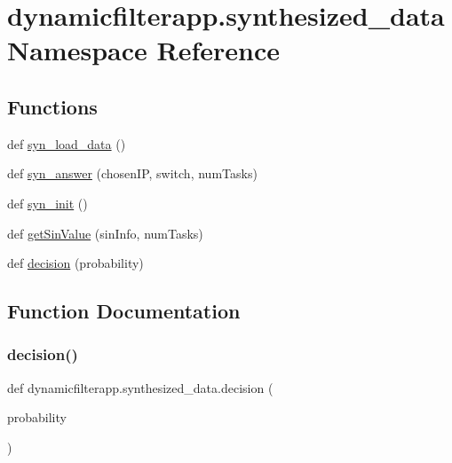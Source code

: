 \hypertarget{namespacedynamicfilterapp_1_1synthesized__data}{}\section{dynamicfilterapp.\+synthesized\+\_\+data Namespace Reference}
\label{namespacedynamicfilterapp_1_1synthesized__data}
\subsection*{Functions}
\begin{DoxyCompactItemize}
\item 
def \mbox{\hyperlink{namespacedynamicfilterapp_1_1synthesized__data_af2a5ccfeb2728fbcc461071a4755b1c9}{syn\+\_\+load\+\_\+data}} ()
\item 
def \mbox{\hyperlink{namespacedynamicfilterapp_1_1synthesized__data_a0e5fb46482e0da528e2f04b80ec56a16}{syn\+\_\+answer}} (chosen\+IP, switch, num\+Tasks)
\item 
def \mbox{\hyperlink{namespacedynamicfilterapp_1_1synthesized__data_aa39bcaa003257ebb92c9584885a3e39f}{syn\+\_\+init}} ()
\item 
def \mbox{\hyperlink{namespacedynamicfilterapp_1_1synthesized__data_a5a0a7234abf6b7bcefdfd576e9065d20}{get\+Sin\+Value}} (sin\+Info, num\+Tasks)
\item 
def \mbox{\hyperlink{namespacedynamicfilterapp_1_1synthesized__data_a72f48dd730b6717fb7657e3bc7705c2f}{decision}} (probability)
\end{DoxyCompactItemize}


\subsection{Function Documentation}
\mbox{\label{namespacedynamicfilterapp_1_1synthesized__data_a72f48dd730b6717fb7657e3bc7705c2f}} 
\subsubsection{\texorpdfstring{decision()}{decision()}}
{\footnotesize\ttfamily def dynamicfilterapp.\+synthesized\+\_\+data.\+decision (\begin{DoxyParamCaption}\item[{}]{probability }\end{DoxyParamCaption})}

